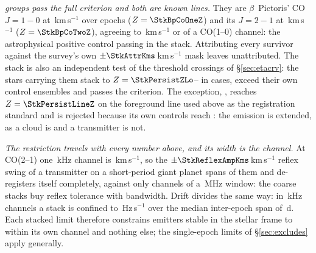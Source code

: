 \emph{\StkNSurvive{} groups pass the full criterion and both are known
lines.} They are $\beta$~Pictoris' CO $J=1\!-\!0$ at
\StkBpCoOneOff\,km\,s$^{-1}$ over \StkBpCoOneN{} epochs ($Z=\StkBpCoOneZ$)
and its $J=2\!-\!1$ at \StkBpCoTwoOff\,km\,s$^{-1}$ ($Z=\StkBpCoTwoZ$),
agreeing to \StkBpCrossKms\,km\,s$^{-1}$ or \StkBpCrossChan{} of a CO(1--0)
channel: the astrophysical positive control passing in the stack.
Attributing every survivor against the survey's own
$\pm\StkAttrKms$\,km\,s$^{-1}$ mask leaves \StkNUnattributedComputed{}
unattributed. The stack is also an independent test of the threshold
crossings of \S\ref{sec:etacrv}: the \StkNPersistStar{} stars carrying them
stack to $Z=\StkPersistZLo$--\StkPersistZHi{} in \StkNPersistBelow{} cases,
\StkNPersistAboveCtrl{} exceed their own control ensembles and
\StkNPersistSurvive{} passes the criterion. The exception,
\StkPersistLineStar, reaches $Z=\StkPersistLineZ$ on the foreground line
used above as the registration standard and is rejected because its own
controls reach \StkPersistLineCtrl: the emission is extended, as a cloud is
and a transmitter is not.

\emph{The restriction travels with every number above, and its width is the
channel.} At CO(2--1) one \StkRefChanKHz\,kHz channel is
\StkTolFineKms\,km\,s$^{-1}$, so the $\pm\StkReflexAmpKms$\,km\,s$^{-1}$
reflex swing of a transmitter on a short-period giant planet spans
\StkReflexChan{} of them and de-registers itself completely, against only
\StkReflexChanCoarse{} channels of a \ChanBModeMHz\,MHz window: the coarse
stacks buy reflex tolerance with bandwidth. Drift divides the same way: in
\StkRefChanKHz\,kHz channels a stack is confined to
\StkDriftTolHzS\,Hz\,s$^{-1}$ over the median inter-epoch span of
\StkSpanMedD\,d. Each stacked limit therefore
constrains emitters stable in the stellar frame to within its own channel and
nothing else; the single-epoch limits of \S\ref{sec:excludes} apply
generally.
